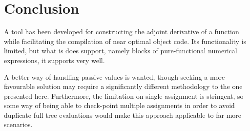 \documentclass[a4paper,10pt]{article}
\begin{document}
\section{Conclusion}
A tool has been developed for constructing the adjoint derivative of a function while facilitating the compilation
of near optimal object code. Its functionality is limited, but what is does support, namely blocks of pure-functional
numerical expressions, it supports very well.

A better way of handling passive values is wanted, though seeking a more favourable solution may require a
significantly different methodology to the one presented here. Furthermore, the limitation on single assignment is
stringent, so some way of being able to check-point multiple assignments in order to avoid duplicate full tree evaluations
would make this approach applicable to far more scenarios.




\end{document}
